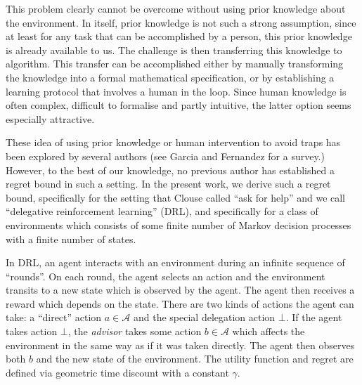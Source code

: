\documentclass[11pt]{article}
\theoremstyle{definition}
\theoremstyle{plain}
\newcommand{\A}{\mathcal{A}}
\begin{document}
This problem clearly cannot be overcome without using prior knowledge about the environment. In itself, prior knowledge is not such a strong assumption, since at least for any task that can be accomplished by a person, this prior knowledge is already available to us. The challenge is then transferring this knowledge to algorithm. This transfer can be accomplished either by manually transforming the knowledge into a formal mathematical specification, or by establishing a learning protocol that involves a human in the loop. Since human knowledge is often complex, difficult to formalise and partly intuitive, the latter option seems especially attractive.

These idea of using prior knowledge or human intervention to avoid traps has been explored by several authors (see Garcia and Fernandez \cite{Garcia2015} for a survey.) However, to the best of our knowledge, no previous author has established a regret bound in such a setting. In the present work, we derive such a regret bound, specifically for the setting that Clouse \cite{Clouse1997} called \enquote{ask for help} and we call \enquote{delegative reinforcement learning} (DRL), and specifically for a class of environments which consists of some finite number of Markov decision processes with a finite number of states.

In DRL, an agent interacts with an environment during an infinite sequence of \enquote{rounds}. On each round, the agent selects an action and the environment transits to a new state which is observed by the agent. The agent then receives a reward which depends on the state. There are two kinds of actions the agent can take: a \enquote{direct} action $a \in \A$ and the special delegation action $\bot$. If the agent takes action $\bot$, the \emph{advisor} takes some action $b \in \A$ which affects the environment in the same way as if it was taken directly. The agent then observes both $b$ and the new state of the environment. The utility function and regret are defined via geometric time discount with a constant $\gamma$.
\end{document}
